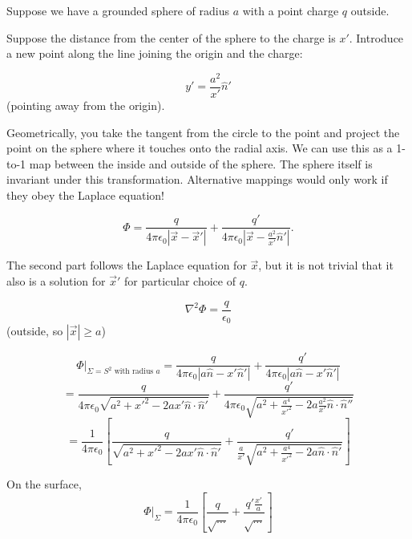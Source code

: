 \documentclass[a4paper,twoside,master.tex]{subfiles}
\begin{document}
Suppose we have a grounded sphere of radius $a$ with a point charge $q$ outside.

Suppose the distance from the center of the sphere to the charge is $x'$. Introduce a new point along the line joining the origin and the charge:

\begin{equation}
   y' = \frac{a^2}{x'}\hat{n}'
\end{equation} (pointing away from the origin).

Geometrically, you take the tangent from the circle to the point and project the point on the sphere where it touches onto the radial axis. We can use this as a 1-to-1 map between the inside and outside of the sphere. The sphere itself is invariant under this transformation. Alternative mappings would only work if they obey the Laplace equation!

\begin{equation}
   \Phi = \frac{q}{4\pi\epsilon_0|\vec{x}-\vec{x}'|} + \frac{q'}{4\pi\epsilon_0|\vec{x}-\frac{a^2}{x'}\hat{n}'|}.
\end{equation}

The second part follows the Laplace equation for $\vec{x}$, but it is not trivial that it also is a solution for $\vec{x}'$ for particular choice of $q$.

\begin{equation}
    \nabla^2\Phi=\frac{q}{\epsilon_0}
\end{equation} (outside, so $|\vec{x}|\geq a$)

\begin{equation}
    \Phi\bigg|_{\Sigma = S^2\text{ with radius }a} = \frac{q}{4\pi\epsilon_0|a\hat{n}-x'\hat{n}'|}+\frac{q'}{4\pi\epsilon_0|a\hat{n}-x'\hat{n}'|}
\end{equation}
\begin{equation}
    = \frac{q}{4\pi\epsilon_0\sqrt{a^2+x'^2-2ax'\hat{n}\cdot\hat{n}'}}+\frac{q'}{4\pi\epsilon_0\sqrt{a^2+\frac{a^4}{x'^2}-2a\frac{a^2}{x'}\hat{n}\cdot\hat{n}''}}
\end{equation}
\begin{equation}
    = \frac{1}{4\pi\epsilon_0}\left[\frac{q}{\sqrt{a^2+x'^2-2ax'\hat{n}\cdot\hat{n}'}}+\frac{q'}{\frac{a}{x'}\sqrt{a^2+\frac{a^4}{x'^2}-2a\hat{n}\cdot\hat{n}'}}\right]
\end{equation}

On the surface,
\begin{equation}
    \Phi\bigg|_\Sigma = \frac{1}{4\pi\epsilon_0}\left[\frac{q}{\sqrt{\dots}} + \frac{q'\frac{x'}{a}}{\sqrt{\dots}}\right]
\end{equation}
\end{document}
